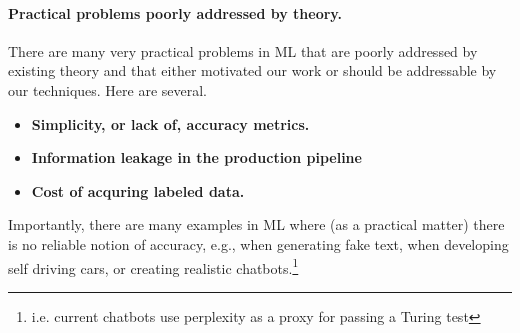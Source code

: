 \paragraph{Practical problems poorly addressed by theory.}
There are many very practical problems in ML that are poorly addressed by existing theory and that either motivated our work or should be addressable by our techniques.
Here are several.
\begin{itemize}
\item
\textbf{Simplicity, or lack of,  accuracy metrics.}
\item
\textbf{Information leakage in the production pipeline}
\item
\textbf{Cost of acquring labeled data.}
\end{itemize}
Importantly, there are many examples in ML where (as a practical matter) there is no reliable notion of accuracy, e.g., when generating fake text, when developing self driving cars, or creating realistic chatbots.\footnote{i.e. current chatbots use perplexity as a proxy for passing a Turing test}
